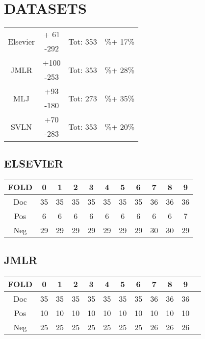 \section{DATASETS}
\begin{table}[htbp]
	\centering
	\begin{tabular}{c | c | c | c}
		\multirow{2}{*}{Elsevier} & + 61 & \multirow{2}{*}{Tot: 353}& \multirow{2}{*}{\%+ 17\%} \\
		 & -292 &  & \\
		 \hline
		 \multirow{2}{*}{JMLR} & +100 & \multirow{2}{*}{Tot: 353} & \multirow{2}{*}{\%+ 28\%} \\
		 & -253 & & \\
 		 \hline
 		 \multirow{2}{*}{MLJ} & +93 & \multirow{2}{*}{Tot: 273} & \multirow{2}{*}{\%+ 35\%} \\
 		 & -180 & & \\
 		 \hline
 		 \multirow{2}{*}{SVLN} & +70 & \multirow{2}{*}{Tot: 353} & \multirow{2}{*}{\%+ 20\%} \\
 		 & -283 & & \\
		\end{tabular}%
	\label{tab:}
\end{table}
\subsection{ELSEVIER}
\begin{table}[htbp]
	\centering
		\begin{tabular}{c | cccccccccc}
			FOLD &  0 &  1 &  2 &  3 &  4 &  5 &  6 &  7 &  8 &  9 \\ \hline
			Doc  & 35 & 35 & 35 & 35 & 35 & 35 & 35 & 36 & 36 & 36 \\
			Pos  & 6  & 6  &  6 &  6 &  6 &  6 &  6 &  6 &  6 &  7 \\
			Neg  & 29 & 29 & 29 & 29 & 29 & 29 & 29 & 30 & 30 & 29 \\
		\end{tabular}%
	\label{tab:Elsevier}
\end{table}
\subsection{JMLR}
\begin{table}[htbp]
	\centering
		\begin{tabular}{c | ccccccccccc}
			FOLD &  0 &  1 &  2 &  3 &  4 &  5 &  6 &  7 &  8 &  9 \\ \hline
			Doc  & 35 & 35 & 35 & 35 & 35 & 35 & 35 & 36 & 36 & 36 \\
			Pos  & 10  & 10  &  10 &  10 &  10 &  10 &  10 &  10 &  10 &  10 \\
			Neg  & 25 & 25 & 25 & 25 & 25 & 25 & 25 & 26 & 26 & 26 \\
		\end{tabular}%
	\label{tab:JMLR}
\end{table}
